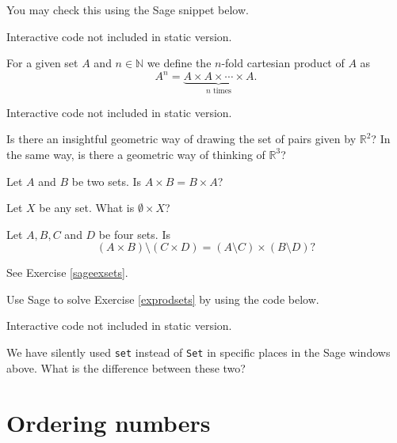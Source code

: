You may check this using the Sage snippet below.

\begin{sage} Interactive code not included in static version.\end{sage}

\begin{definition}
  For a given set $A$ and $n\in \mathbb{N}$ we define the $n$-fold cartesian product of $A$ as
  $$
    A^n = \underbrace{A\times A\times \cdots \times A}_{n\text{ times}}.
  $$
\end{definition}

\begin{sage} Interactive code not included in static version.\end{sage}

\begin{exercise}
  Is there an insightful geometric way of drawing the set of pairs given by $\mathbb{R}^2$? In the same way, is there a geometric
  way of thinking of $\mathbb{R}^3$?
\end{exercise}

\begin{exercise}\label{exprodsets}
  Let $A$ and $B$ be two sets. Is $A\times B = B \times A$?

  Let $X$ be any set. What is $\emptyset \times X$?

  Let $A, B, C$ and $D$ be four sets. Is
  $$
    (A\times B)\setminus (C\times D) = (A\setminus C)\times (B\setminus D)?
  $$

  \begin{hint}
    See Exercise \ref{sageexsets}.
  \end{hint}
\end{exercise}

\begin{exercise}\label{sageexsets}
  Use Sage to solve Exercise \ref{exprodsets} by using the code below.

  \begin{sage} Interactive code not included in static version.\end{sage}

\end{exercise}

\begin{exercise}
  We have silently used \texttt{set} instead of \texttt{Set} in specific places in the Sage windows above.
  What is the difference between these two?
\end{exercise}

\section{Ordering numbers}

